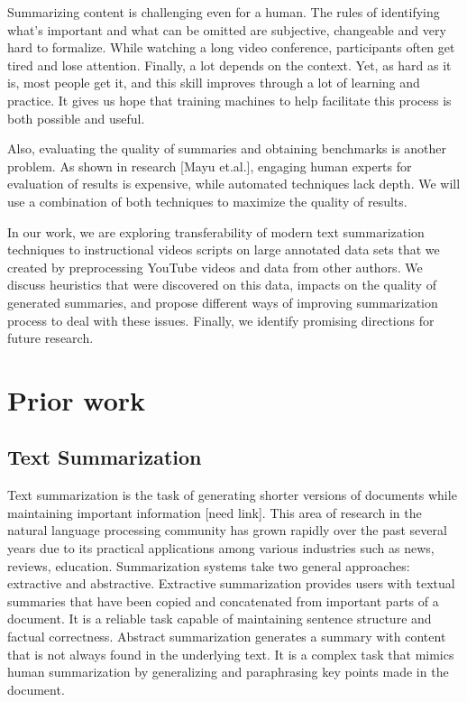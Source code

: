 \documentclass{article}
\begin{document}
Summarizing content is challenging even for a human. The rules of identifying what’s important and what can be omitted are subjective, changeable and very hard to formalize. While watching a long video conference, participants often get tired and lose attention. Finally, a lot depends on the context. Yet, as hard as it is, most people get it, and this skill improves through a lot of learning and practice. It gives us hope that training machines to help facilitate this process is both possible and useful. 

Also, evaluating the quality of summaries and obtaining benchmarks is another problem. As shown in research [Mayu et.al.], engaging human experts for evaluation of results is expensive, while automated techniques lack depth. We will use a combination of both techniques to maximize the quality of results. 

In our work, we are exploring transferability of modern text summarization techniques to  instructional videos scripts on large annotated data sets that we created by preprocessing YouTube videos and  data from other authors. We discuss heuristics that were discovered on this data, impacts on the quality of generated summaries, and propose different ways of improving summarization process to deal with these issues. Finally, we identify promising directions for future research.

\section{Prior work}

\subsection{Text Summarization}

Text summarization is the task of generating shorter versions of documents while maintaining important information [need link]. This area of research in the natural language processing community has grown rapidly over the past several years due to its practical applications among various industries such as news, reviews, education. Summarization systems take two general approaches: extractive and abstractive. Extractive summarization provides users with textual summaries that have been copied and concatenated from important parts of a document. It is a reliable task capable of maintaining sentence structure and factual correctness. Abstract summarization generates a summary with content that is not always found in the underlying text. It is a complex task that mimics human summarization by generalizing and paraphrasing key points made in the document. 
\end{document}
